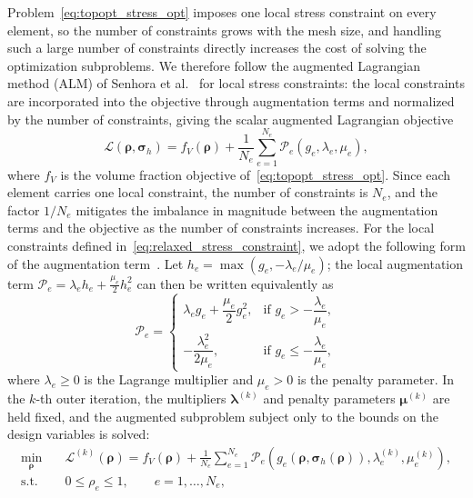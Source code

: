 Problem~\eqref{eq:topopt_stress_opt} imposes one local stress constraint on every element, so the number of constraints grows with the mesh size, and handling such a large number of constraints directly increases the cost of solving the optimization subproblems. We therefore follow the augmented Lagrangian method (ALM) of Senhora et al.~\cite{Senhora2020} for local stress constraints: the local constraints are incorporated into the objective through augmentation terms and normalized by the number of constraints, giving the scalar augmented Lagrangian objective
\begin{equation}
\label{eq:al_functional}
\mathcal{L}(\boldsymbol{\rho}, \boldsymbol{\sigma}_h)
= f_V(\boldsymbol{\rho}) + \frac{1}{N_e} \sum_{e=1}^{N_e} \mathcal{P}_e(g_e, \lambda_e, \mu_e),
\end{equation}
where $f_V$ is the volume fraction objective of~\eqref{eq:topopt_stress_opt}. Since each element carries one local constraint, the number of constraints is $N_e$, and the factor $1/N_e$ mitigates the imbalance in magnitude between the augmentation terms and the objective as the number of constraints increases. For the local constraints defined in~\eqref{eq:relaxed_stress_constraint}, we adopt the following form of the augmentation term~\cite{GiraldoLondono2021}. Let $h_e = \max(g_e, -\lambda_e/\mu_e)$; the local augmentation term $\mathcal{P}_e = \lambda_e h_e + \frac{\mu_e}{2} h_e^2$ can then be written equivalently as
\begin{equation}
\label{eq:al_penalty_term}
\mathcal{P}_e =
\begin{cases}
\lambda_e g_e + \dfrac{\mu_e}{2} g_e^2, & \text{if } g_e > -\dfrac{\lambda_e}{\mu_e}, \\[6pt]
-\dfrac{\lambda_e^2}{2\mu_e}, & \text{if } g_e \le -\dfrac{\lambda_e}{\mu_e},
\end{cases}
\end{equation}
where $\lambda_e \ge 0$ is the Lagrange multiplier and $\mu_e > 0$ is the penalty parameter. In the $k$-th outer iteration, the multipliers $\boldsymbol{\lambda}^{(k)}$ and penalty parameters $\boldsymbol{\mu}^{(k)}$ are held fixed, and the augmented subproblem subject only to the bounds on the design variables is solved:
\begin{equation}
\label{eq:al_subproblem}
\begin{aligned}
\min_{\boldsymbol{\rho}} \quad &
\mathcal{L}^{(k)}(\boldsymbol{\rho})
= f_V(\boldsymbol{\rho}) + \frac{1}{N_e} \sum_{e=1}^{N_e}
\mathcal{P}_e\!\left(g_e(\boldsymbol{\rho}, \boldsymbol{\sigma}_h(\boldsymbol{\rho})), \lambda_e^{(k)}, \mu_e^{(k)}\right), \\
\text{s.t.} \quad & 0 \le \rho_e \le 1, \qquad e = 1, \dots, N_e,
\end{aligned}
\end{equation}
